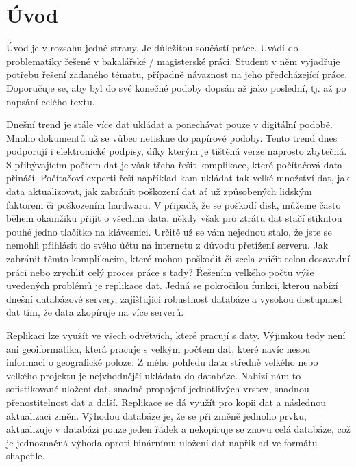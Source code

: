 \documentclass{thesisKGI}
\begin{document}
    \section*{Úvod}

      Úvod je v rozsahu jedné strany. Je důležitou součástí práce. Uvádí
      do problematiky řešené v bakalářské / magisterské práci. Student v
      něm vyjadřuje potřebu řešení zadaného tématu, případně návaznost na
      jeho předcházející práce. Doporučuje se, aby byl do své konečné
      podoby dopsán až jako poslední, tj. až po napsání celého textu.

      Dnešní trend je stále více dat ukládat a ponechávat pouze v
      digitální podobě. Mnoho dokumentů už se vůbec netiskne do papírové
      podoby. Tento trend dnes podporují i elektronické podpisy, díky
      kterým je tištěná verze naprosto zbytečná. S přibývajícím počtem
      dat je však třeba řešit komplikace, které počítačová data přináší.
      Počítačoví experti řeší například kam ukládat tak velké množství
      dat, jak data aktualizovat, jak zabránit poškození dat ať už
      způsobených lidským faktorem či poškozením hardwaru. V připadě, že
      se poškodí disk, můžeme často během okamžiku přijít o všechna
      data, někdy však pro ztrátu dat stačí stikntou pouhé jedno
      tlačítko na klávesnici. Určitě už se vám nejednou stalo, že jste
      se nemohli přihlásit do svého účtu na internetu z důvodu přetížení
      serveru. Jak zabránit těmto komplikacím, které mohou poškodit či
      zcela zničit celou dosavadní práci nebo zrychlit celý proces práce
      s tady? Řešením velkého počtu výše uvedených problémů je replikace
      dat. Jedná se pokročilou funkci, kterou nabízí dnešní databázové
      servery, zajišťující robustnost databáze a vysokou dostupnost dat
      tím, že data zkopíruje na více serverů.
      
      Replikaci lze využít ve všech odvětvích, které pracují s daty.
      Výjimkou tedy není ani geoiformatika, která pracuje s velkým
      počtem dat, které navíc nesou informaci o geografické poloze. Z
      mého pohledu data středně velkého nebo velkého projektu je
      nejvhodnější ukládata do databáze. Nabízí nám to sofistikované
      uložení dat, snadné propojení jednotlivých vrstev, snadnou
      přenostitelnost dat a další. Replikace se dá využít pro kopii 
      dat a následnou aktualizaci změn. Výhodou databáze je, že se při
      změně jednoho prvku, aktualizuje v databázi pouze jeden řádek a
      nekopíruje se znovu celá databáze, což je jednoznačná výhoda
      oproti binárnímu uložení dat napřiklad ve formátu shapefile.
      
\end{document}
